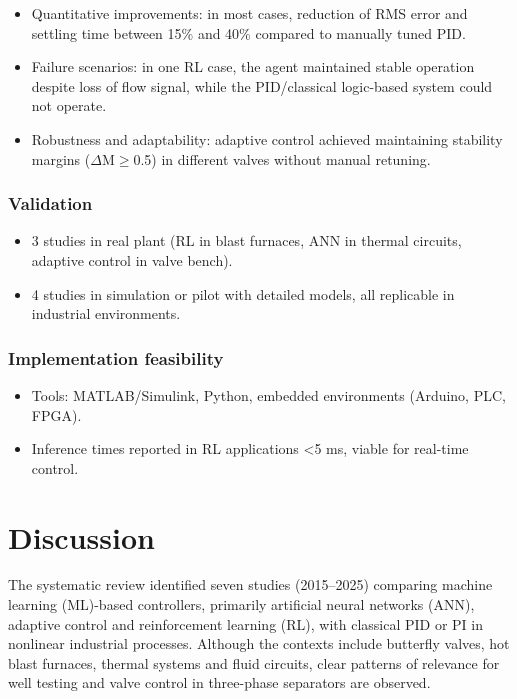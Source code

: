 \documentclass{article}
\begin{document}
\begin{itemize}
  \item Quantitative improvements: in most cases, reduction of RMS error and settling time between 15\% and 40\% compared to manually tuned PID.
  \item Failure scenarios: in one RL case, the agent maintained stable operation despite loss of flow signal, while the PID/classical logic-based system could not operate.
  \item Robustness and adaptability: adaptive control achieved maintaining stability margins ($\Delta$M$\geq$0.5) in different valves without manual retuning.
\end{itemize}

\subsubsection{Validation}

\begin{itemize}
  \item 3 studies in real plant (RL in blast furnaces, ANN in thermal circuits, adaptive control in valve bench).
  \item 4 studies in simulation or pilot with detailed models, all replicable in industrial environments.
\end{itemize}

\subsubsection{Implementation feasibility}

\begin{itemize}
  \item Tools: MATLAB/Simulink, Python, embedded environments (Arduino, PLC, FPGA).
  \item Inference times reported in RL applications <5 ms, viable for real-time control.
\end{itemize}

\section{Discussion}

The systematic review identified seven studies (2015–2025) comparing machine learning (ML)-based controllers, primarily artificial neural networks (ANN), 
adaptive control and reinforcement learning (RL), with classical PID or PI in nonlinear industrial processes. Although the contexts include butterfly valves, hot blast 
furnaces, thermal systems and fluid circuits, clear patterns of relevance for well testing and valve control in three-phase separators are observed.
\end{document}
